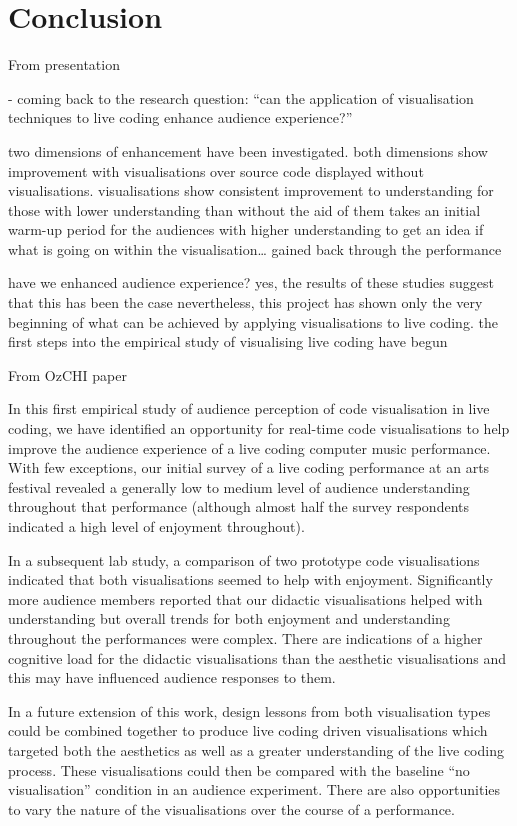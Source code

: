 
\chapter{Conclusion}
\label{chap:conclusion}

From presentation

-  coming back to the research question:
	``can the application of visualisation techniques to live coding enhance audience experience?''

 two dimensions of enhancement have been investigated. 
 both dimensions show improvement with visualisations over source code displayed without visualisations.
visualisations show consistent improvement to understanding for those with lower understanding than without the aid of them 
takes an initial warm-up period for the audiences with higher understanding to get an idea if what is going on within the visualisation… gained back through the performance

have we enhanced audience experience?
yes, the results of these studies suggest that this has been the case
nevertheless, this project has shown only the very beginning of what can be achieved by applying visualisations to live coding.
the first steps into the empirical study of visualising live coding have begun


From OzCHI paper

In this first empirical study of audience perception of code visualisation in live coding, we have identified an opportunity for real-time code visualisations to help improve the audience experience of a live coding computer music performance. With few exceptions, our initial survey of a live coding performance at an arts festival revealed a generally low to medium level of audience understanding throughout that performance (although almost half the survey respondents indicated a high level of enjoyment throughout).

In a subsequent lab study, a comparison of two prototype code visualisations indicated that both visualisations seemed to help with enjoyment. Significantly more audience members reported that our didactic visualisations helped with understanding but overall trends for both enjoyment and understanding throughout the performances were complex. There are indications of a higher cognitive load for the didactic visualisations than the aesthetic visualisations and this may have influenced audience responses to them.

In a future extension of this work, design lessons from both visualisation types could be combined together to produce live coding driven visualisations which targeted both the aesthetics as well as a greater understanding of the live coding process. These visualisations could then be compared with the baseline ``no visualisation'' condition in an audience experiment. There are also opportunities to vary the nature of the visualisations over the course of a performance.

